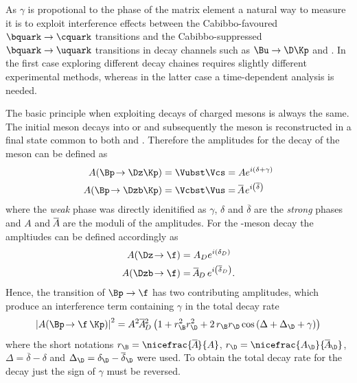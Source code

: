 As $\gamma$ is propotional to the phase of the matrix element \Vub a natural way to measure it is to exploit interference effects between the Cabibbo-favoured $\bquark\to\cquark$ transitions and the Cabibbo-suppressed $\bquark\to\uquark$ transitions in decay channels such as $\Bu\to\D\Kp$ and \BsToDsK.
In the first case exploring different \D decay chaines requires slightly different experimental methods, whereas in the latter case a time-dependent analysis is needed.

The basic principle when exploiting decays of charged \B mesons is always the same.
The initial \Bpm meson decays into \Dz\Kpm or \Dzb\Kpm and subsequently the \D meson is reconstructed in a final state common to both \Dz and \Dzb.
Therefore the amplitudes for the decay of the \B meson can be defined as
\begin{equation}
\begin{aligned}
A\!\left(\Bp\!\to\Dz\Kp\right)&=\Vubst\Vcs=Ae^{i\left(\delta+\gamma\right)}\\
A\!\left(\Bp\!\to\Dzb\Kp\right)&=\Vcbst\Vus=\overline{\kern -1.0pt A\kern -1.0pt}\,e^{i\left(\overline{\delta}\right)}
\end{aligned}
\end{equation}
where the \emph{weak} phase was directly idenitified as $\gamma$, $\delta$ and $\overline{\delta}$ are the \emph{strong} phases and $A$ and $\overline{\kern -1.0pt A\kern -1.0pt}$ are the moduli of the amplitudes.
For the \D-meson decay the ampltiudes can be defined accordingly as
\begin{equation}
\begin{aligned}
A\!\left(\Dz\!\to\f\right)&=A_De^{i\left(\delta_D\right)}\\
A\!\left(\Dzb\!\to\f\right)&=\overline{\kern -1.0pt A\kern -1.0pt}_D\,e^{i\left(\overline{\delta}_D\right)}.
\end{aligned}
\end{equation}
Hence, the transition of $\Bp\to\f$ has two contributing amplitudes, which produce an interference term containing $\gamma$ in the total decay rate
\begin{equation}
\left|A\!\left(\Bp\!\to\f\,\Kp\right)\right|^2=A^2\overline{\kern -1.0pt A\kern -1.0pt}{}_D^2\left(1+r_\B^2r_\D^2+2\,r_\B r_\D\cos\left(\Delta+\Delta_\D+\gamma\right)\right)\label{eq:totDecRateChargedB}
\end{equation}
where the short notations $r_\B=\nicefrac{\overline{\kern -1.0pt A\kern -1.0pt}}{A}$, $r_\D=\nicefrac{A_\D}{\overline{\kern -1.0pt A\kern -1.0pt}_\D}$, $\Delta=\overline{\delta}-\delta$ and $\Delta_\D=\delta_\D-\overline{\delta}_\D$ were used.
To obtain the total decay rate for the \Bm decay just the sign of $\gamma$ must be reversed.

